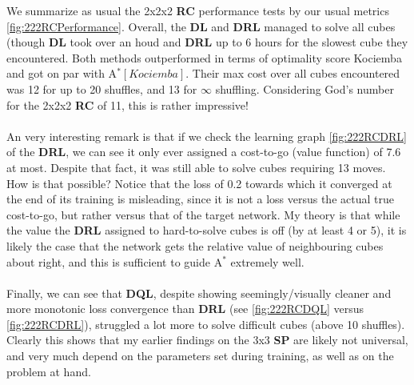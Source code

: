 
We summarize as usual the 2x2x2 \textbf{RC} performance tests by our usual metrics \ref{fig:222RCPerformance}. Overall, the \textbf{DL} and \textbf{DRL} managed to solve all cubes (though \textbf{DL} took over an houd and \textbf{DRL} up to 6 hours for the slowest cube they encountered. Both methods outperformed in terms of optimality score Kociemba and got on par with A$^{*}[Kociemba]$. Their max cost over all cubes encountered was 12 for up to 20 shuffles, and 13 for $\infty$ shuffling. Considering God's number for the 2x2x2 \textbf{RC} of 11, this is rather impressive!
\\
\\
An very interesting remark is that if we check the learning graph \ref{fig:222RCDRL} of the \textbf{DRL}, we can see it only ever assigned a cost-to-go (value function) of 7.6 at most. Despite that fact, it was still able to solve cubes requiring 13 moves. How is that possible? Notice that the loss of 0.2 towards which it converged at the end of its training is misleading, since it is not a loss versus the actual true cost-to-go, but rather versus that of the target network. My theory is that while the value the \textbf{DRL} assigned to hard-to-solve cubes is off (by at least 4 or 5), it is likely the case that the network gets the relative value of neighbouring cubes about right, and this is sufficient to guide A$^{*}$ extremely well.
\\
\\
Finally, we can see that \textbf{DQL}, despite showing seemingly/visually cleaner and more monotonic loss convergence than \textbf{DRL} (see \ref{fig:222RCDQL} versus \ref{fig:222RCDRL}), struggled a lot more to solve difficult cubes (above 10 shuffles). Clearly this shows that my earlier findings on the 3x3 \textbf{SP} are likely not universal, and very much depend on the parameters set during training, as well as on the problem at hand.

